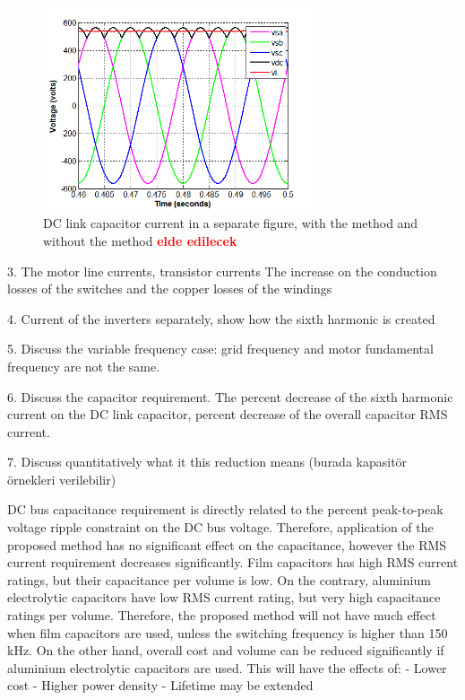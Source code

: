 \documentclass[conference,a4paper,twocolumn]{IEEEtran}
\begin{document}
\begin{figure}[htp]
  \centering
  \includegraphics[width=8cm]{images/sample}
  \caption{DC link capacitor current in a separate figure, with the method and without the method  \textbf{\textcolor{red}{elde edilecek}}}
  \label{fig:sample}
\end{figure}
3. The motor line currents, transistor currents
The increase on the conduction losses of the switches and the copper losses of the windings

4. Current of the inverters separately, show how the sixth harmonic is created

5. Discuss the variable frequency case: grid frequency and motor fundamental frequency are not the same.

6. Discuss the capacitor requirement. The percent decrease of the sixth harmonic current on the DC link capacitor, percent decrease of the overall capacitor RMS current.

7. Discuss quantitatively what it this reduction means (burada kapasitör örnekleri verilebilir)

DC bus capacitance requirement is directly related to the percent peak-to-peak voltage ripple constraint on the DC bus voltage. Therefore, application of the proposed method has no significant effect on the capacitance, however the RMS current requirement decreases significantly.
Film capacitors has high RMS current ratings, but their capacitance per volume is low. On the contrary, aluminium electrolytic capacitors have low RMS current rating, but very high capacitance ratings per volume. Therefore, the proposed method will not have much effect when film capacitors are used, unless the switching frequency is higher than 150 kHz. On the other hand, overall cost and volume can be reduced significantly if aluminium electrolytic capacitors are used.
This will have the effects of:
- Lower cost
- Higher power density
- Lifetime may be extended
\end{document}
